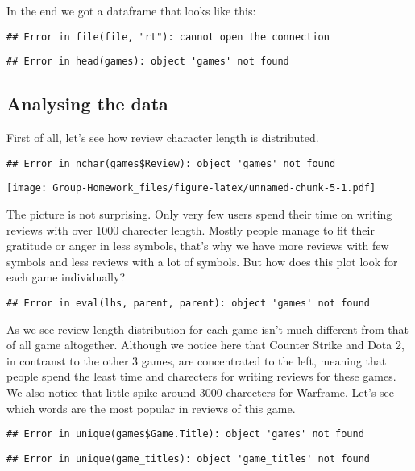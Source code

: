 \documentclass[]{article}
\begin{document}
In the end we got a dataframe that looks like this:

\begin{verbatim}
## Error in file(file, "rt"): cannot open the connection
\end{verbatim}

\begin{verbatim}
## Error in head(games): object 'games' not found
\end{verbatim}

\subsection{Analysing the data}\label{analysing-the-data-1}

First of all, let's see how review character length is distributed.

\begin{verbatim}
## Error in nchar(games$Review): object 'games' not found
\end{verbatim}

\texttt{[image: Group-Homework\_files/figure-latex/unnamed-chunk-5-1.pdf]}

The picture is not surprising. Only very few users spend their time on
writing reviews with over 1000 charecter length. Mostly people manage to
fit their gratitude or anger in less symbols, that's why we have more
reviews with few symbols and less reviews with a lot of symbols. But how
does this plot look for each game individually?

\begin{verbatim}
## Error in eval(lhs, parent, parent): object 'games' not found
\end{verbatim}

As we see review length distribution for each game isn't much different
from that of all game altogether. Although we notice here that Counter
Strike and Dota 2, in contranst to the other 3 games, are concentrated
to the left, meaning that people spend the least time and charecters for
writing reviews for these games. We also notice that little spike around
3000 charecters for Warframe. Let's see which words are the most popular
in reviews of this game.

\begin{verbatim}
## Error in unique(games$Game.Title): object 'games' not found
\end{verbatim}

\begin{verbatim}
## Error in unique(game_titles): object 'game_titles' not found
\end{verbatim}
\end{document}
